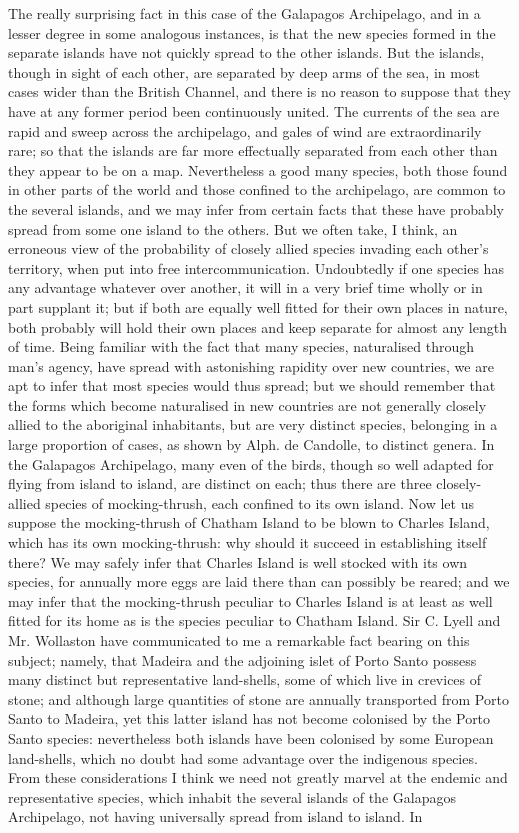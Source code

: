 \indent The really surprising fact in this case of the Galapagos Archipelago, and in a lesser degree in some analogous instances, is that the new species formed in the separate islands have not quickly spread to the other islands. But the islands, though in sight of each other, are separated by deep arms of the sea, in most cases wider than the British Channel, and there is no reason to suppose that they have at any former period been continuously united. The currents of the sea are rapid and sweep across the archipelago, and gales of wind are extraordinarily rare; so that the islands are far more effectually separated from each other than they appear to be on a map. Nevertheless a good many species, both those found in other parts of the world and those confined to the archipelago, are common to the several islands, and we may infer from certain facts that these have probably spread from some one island to the others. But we often take, I think, an erroneous view of the probability of closely allied species invading each other's territory, when put into free intercommunication. Undoubtedly if one species has any advantage whatever over another, it will in a very brief time wholly or in part supplant it; but if both are equally well fitted for their own places in nature, both probably will hold their own places and keep separate for almost any length of time. Being familiar with the fact that many species, naturalised through man's agency, have spread with astonishing rapidity over new countries, we are apt to infer that most species would thus spread; but we should remember that the forms which become naturalised in new countries are not generally closely allied to the aboriginal inhabitants, but are very distinct species, belonging in a large proportion of cases, as shown by Alph. de Candolle, to distinct genera. In the Galapagos Archipelago, many even of the birds, though so well adapted for flying from island to island, are distinct on each; thus there are three closely-allied species of mocking-thrush, each confined to its own island. Now let us suppose the mocking-thrush of Chatham Island to be blown to Charles Island, which has its own mocking-thrush: why should it succeed in establishing itself there? We may safely infer that Charles Island is well stocked with its own species, for annually more eggs are laid there than can possibly be reared; and we may infer that the mocking-thrush peculiar to Charles Island is at least as well fitted for its home as is the species peculiar to Chatham Island. Sir C. Lyell and Mr. Wollaston have communicated to me a remarkable fact bearing on this subject; namely, that Madeira and the adjoining islet of Porto Santo possess many distinct but representative land-shells, some of which live in crevices of stone; and although large quantities of stone are annually transported from Porto Santo to Madeira, yet this latter island has not become colonised by the Porto Santo species: nevertheless both islands have been colonised by some European land-shells, which no doubt had some advantage over the indigenous species. From these considerations I think we need not greatly marvel at the endemic and representative species, which inhabit the several islands of the Galapagos Archipelago, not having universally spread from island to island. In 